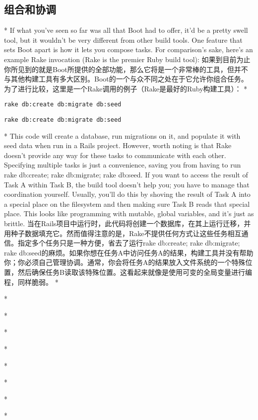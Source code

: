 \begin{paracol}{2}
\section{组合和协调}
\switchcolumn[0]*
If what you've seen so far was all that Boot had to offer, it'd be a
pretty swell tool, but it wouldn't be very different from other build
tools. One feature that sets Boot apart is how it lets you compose
tasks. For comparison's sake, here's an example Rake invocation (Rake is
the premier Ruby build tool):
\switchcolumn
如果到目前为止你所见到的就是Boot所提供的全部功能，那么它将是一个非常棒的工具，但并不与其他构建工具有多大区别。Boot的一个与众不同之处在于它允许你组合任务。为了进行比较，这里是一个Rake调用的例子（Rake是最好的Ruby构建工具）：
\switchcolumn[0]*
\begin{verbatim}
rake db:create db:migrate db:seed
\end{verbatim}
\switchcolumn
\begin{verbatim}
rake db:create db:migrate db:seed
\end{verbatim}
\switchcolumn[0]*
This code will create a database, run migrations on it, and populate it
with seed data when run in a Rails project. However, worth noting is
that Rake doesn't provide any way for these tasks to communicate with
each other. Specifying multiple tasks is just a convenience, saving you
from having to run rake db:create; rake db:migrate; rake db:seed. If you
want to access the result of Task A within Task B, the build tool
doesn't help you; you have to manage that coordination yourself.
Usually, you'll do this by shoving the result of Task A into a special
place on the filesystem and then making sure Task B reads that special
place. This looks like programming with mutable, global variables, and
it's just as brittle.
\switchcolumn
当在Rails项目中运行时，此代码将创建一个数据库，在其上运行迁移，并用种子数据填充它。然而值得注意的是，Rake不提供任何方式让这些任务相互通信。指定多个任务只是一种方便，省去了运行rake db:create; rake db:migrate; rake db:seed的麻烦。如果你想在任务A中访问任务A的结果，构建工具并没有帮助你；你必须自己管理协调。通常，你会将任务A的结果放入文件系统的一个特殊位置，然后确保任务B读取该特殊位置。这看起来就像是使用可变的全局变量进行编程，同样脆弱。
\switchcolumn[0]*

\switchcolumn


\switchcolumn[0]*

\switchcolumn


\switchcolumn[0]*

\switchcolumn

\switchcolumn[0]*

\switchcolumn


\switchcolumn[0]*

\switchcolumn

\switchcolumn[0]*

\switchcolumn


\switchcolumn[0]*

\switchcolumn

\switchcolumn[0]*

\switchcolumn


\switchcolumn[0]*

\switchcolumn

\end{paracol}



